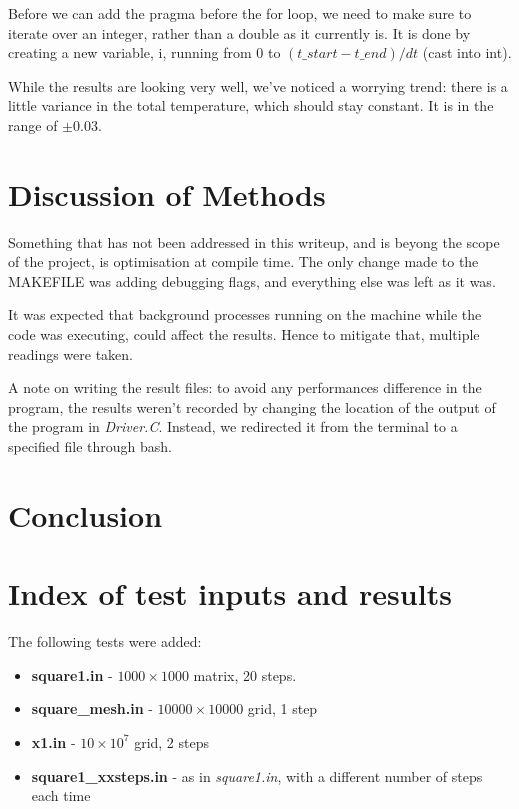 \documentclass[11pt,journal]{IEEEtran}
\begin{document}
	Before we can add the pragma before the for loop, we need to make sure to iterate over an integer, rather than a double as it currently is. It is done by creating a new variable, i, running from 0 to $(t\_start - t\_end) / dt$ (cast into int).
	
	While the results are looking very well, we've noticed a worrying trend: there is a little variance in the total temperature, which should stay constant. It is in the range of $\pm 0.03$.
	
	\section{Discussion of Methods}
	Something that has not been addressed in this writeup, and is beyong the scope of the project, is optimisation at compile time. The only change made to the MAKEFILE was adding debugging flags, and everything else was left as it was.
	
	It was expected that background processes running on the machine while the code was executing, could affect the results. Hence to mitigate that, multiple readings were taken.
	
	A note on writing the result files: to avoid any performances difference in the program, the results weren't recorded by changing the location of the output of the program in \emph{Driver.C}. Instead, we redirected it from the terminal to a specified file through bash.
	
	\section{Conclusion}

	
	
	
	
		
		
	\appendices
	\section{Index of test inputs and results}
	The following tests were added:
	\begin{itemize}

		\item \textbf{square1.in} - $1000 \times 1000$ matrix, 20 steps.
		\item \textbf{square\_mesh.in} - $10000 \times 10000$ grid, 1 step
		\item \textbf{x1.in} - $10 \times 10^7$ grid, 2 steps
		\item \textbf{square1\_xxsteps.in} - as in \emph{square1.in}, with a different number of steps each time


	\end{itemize}
	
\end{document}
